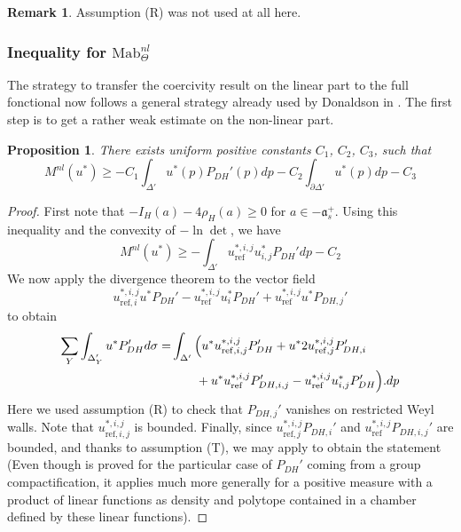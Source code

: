 \documentclass{amsart}
\newtheorem{prop}[thm]{Proposition}
\theoremstyle{definition}
\newtheorem{rem}[thm]{Remark}
\begin{document}
\begin{rem}
Assumption (R) was not used at all here.
\end{rem}

\subsubsection{Inequality for $\mathrm{Mab}^{nl}_{\Theta}$}

The strategy to transfer the coercivity result on the linear part 
to the full fonctional now follows a general strategy already used by 
Donaldson in \cite{Don02}. 
The first step is to get a rather weak estimate on the non-linear part.

\begin{prop}
\label{prop_weak_Mnl}
There exists uniform positive constants $C_1$, $C_2$, $C_3$, such that 
\[
M^{nl}(u^*)\geq 
-C_1\int_{\Delta'} u^*(p)P_{DH}'(p)dp
-C_2\int_{\partial \Delta'}u^*(p)dp
-C_3
\]
\end{prop}

\begin{proof}
First note that $-I_H(a)-4\rho_H(a)\geq 0$ for $a\in-\mathfrak{a}_s^+$. 
Using this inequality and the convexity of $-\ln\det$, we have 
\[
M^{nl}(u^*)\geq 
-\int_{\Delta'}u^{*,i,j}_{\mathrm{ref}}u^*_{i,j}P_{DH}'dp
-C_2
\]
We now apply the divergence theorem to the vector field 
\[
u^{*,i,j}_{\mathrm{ref},i}u^*P_{DH}'-u^{*,i,j}_{\mathrm{ref}}u^*_iP_{DH}'
+u^{*,i,j}_{\mathrm{ref}}u^*P_{DH,j}'
\]
to obtain 
\begin{align*}
\sum_Y \int_{\Delta'_Y}u^*P_{DH}'d\sigma 
= & 
\int_{\Delta'} 
\Big{(}
u^*u^{*,i,j}_{\mathrm{ref},i,j}P_{DH}'
+u^*2u^{*,i,j}_{\mathrm{ref},j}P_{DH,i}' \\ & \qquad 
+u^*u^{*,i,j}_{\mathrm{ref}}P_{DH,i,j}'
-u^{*,i,j}_{\mathrm{ref}}u^*_{i,j}P_{DH}'
\Big{)}.
dp
\end{align*}
Here we used assumption (R) to check that $P_{DH,j}'$ 
vanishes on restricted Weyl walls. 
Note that $u^{*,i,j}_{\mathrm{ref},i,j}$ is bounded.
Finally, since $u^{*,i,j}_{\mathrm{ref},j}P_{DH,i}'$ 
and $u^{*,i,j}_{\mathrm{ref}}P_{DH,i,j}'$ are bounded, and 
thanks to assumption (T), we may apply \cite[Lemma~4.6]{LZZ} 
to obtain the statement (Even though \cite[Lemma~4.6]{LZZ} is proved for the particular case 
of $P_{DH}'$ coming from a group compactification, it applies 
much more generally for a positive measure with a product of 
linear functions as density and polytope contained in a chamber 
defined by these linear functions). 
\end{proof}
\end{document}
